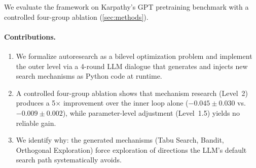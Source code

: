We evaluate the framework on Karpathy's GPT pretraining benchmark
with a controlled four-group ablation (\cref{sec:methods}).

\paragraph{Contributions.}
\begin{enumerate}
  \item We formalize autoresearch as a bilevel optimization problem and
        implement the outer level via a 4-round LLM dialogue that generates
        and injects new search mechanisms as Python code at runtime.
  \item A controlled four-group ablation shows that mechanism research
        (Level~2) produces a 5$\times$ improvement over the inner loop alone
        ($-0.045 \pm 0.030$ vs.\ $-0.009 \pm 0.002$), while parameter-level
        adjustment (Level~1.5) yields no reliable gain.
  \item We identify why: the generated mechanisms (Tabu Search, Bandit,
        Orthogonal Exploration) force exploration of directions the LLM's
        default search path systematically avoids.
\end{enumerate}
